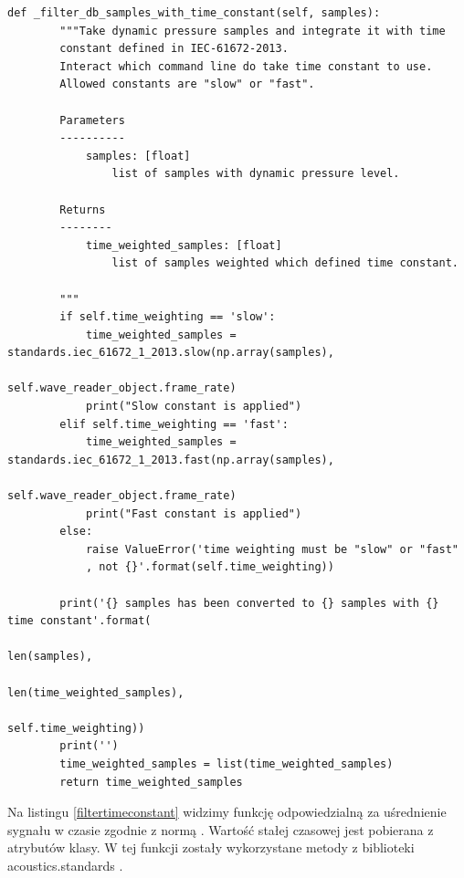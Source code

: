 \documentclass[eng,printmode]{mgr}
\begin{document}
\begin{minipage}{\linewidth}
\begin{lstlisting}[caption={fragment kodu źródłowego pliku SampledBConverter.py,\newline klasa SamplesDbFSConverter,\newline metoda \_filter\_db\_samples\_with\_time\_constant},captionpos=b,label={filtertimeconstant}]
    def _filter_db_samples_with_time_constant(self, samples):
        """Take dynamic pressure samples and integrate it with time
        constant defined in IEC-61672-2013.
        Interact which command line do take time constant to use.
        Allowed constants are "slow" or "fast".

        Parameters
        ----------
            samples: [float]
                list of samples with dynamic pressure level.

        Returns
        --------
            time_weighted_samples: [float]
                list of samples weighted which defined time constant.

        """
        if self.time_weighting == 'slow':
            time_weighted_samples = standards.iec_61672_1_2013.slow(np.array(samples),
                                                            self.wave_reader_object.frame_rate)
            print("Slow constant is applied")
        elif self.time_weighting == 'fast':
            time_weighted_samples = standards.iec_61672_1_2013.fast(np.array(samples),
                                                            self.wave_reader_object.frame_rate)
            print("Fast constant is applied")
        else:
            raise ValueError('time weighting must be "slow" or "fast"
            , not {}'.format(self.time_weighting))

        print('{} samples has been converted to {} samples with {} time constant'.format(
        															len(samples),
                                                                    len(time_weighted_samples),
                                                                    self.time_weighting))
        print('')
        time_weighted_samples = list(time_weighted_samples)
        return time_weighted_samples
\end{lstlisting}
\end{minipage}

Na listingu \ref{filtertimeconstant} widzimy funkcję odpowiedzialną za uśrednienie sygnału w czasie zgodnie z normą  \cite{IEC-61672-2013}. Wartość stałej czasowej jest pobierana z atrybutów klasy. W tej funkcji zostały wykorzystane metody z biblioteki acoustics.standards \cite{acoustics}.
\end{document}
